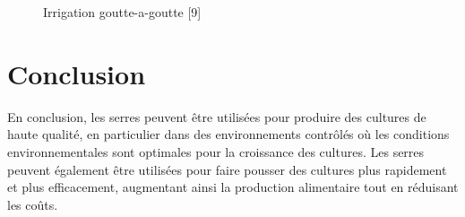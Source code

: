 \begin{figure}[!h]
\centering
	\label{fig:irrigation goutte-a-goutte}
	
	
	\caption{Irrigation goutte-a-goutte [9]}
\end{figure}
\pagebreak

\section{Conclusion}
En conclusion, les serres peuvent être utilisées pour produire des cultures de haute qualité, en particulier dans des environnements contrôlés où les conditions environnementales sont optimales pour la croissance des cultures. Les serres peuvent également être utilisées pour faire pousser des cultures plus rapidement et plus efficacement, augmentant ainsi la production alimentaire tout en réduisant les coûts. 

